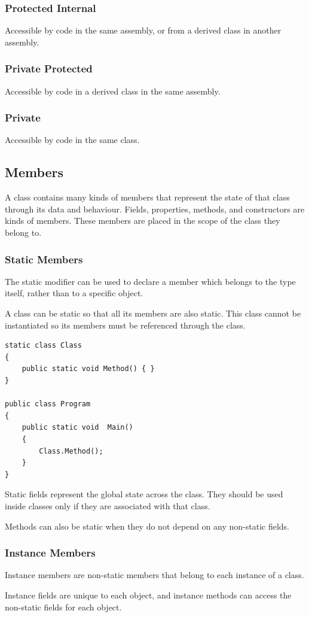 \documentclass{article}
\begin{document}
\subsubsection{Protected Internal}
Accessible by code in the same assembly, or from a derived class in another assembly.
\subsubsection{Private Protected}
Accessible by code in a derived class in the same assembly.
\subsubsection{Private}
Accessible by code in the same class.
\subsection{Members}
A class contains many kinds of members that represent the state of that class through its data and behaviour.
Fields, properties, methods, and constructors are kinds of members.
These members are placed in the scope of the class they belong to.
\subsubsection{Static Members}
The static modifier can be used to declare a member which belongs to the type itself, 
rather than to a specific object.

A class can be static so that all its members are also static. This class cannot be 
instantiated so its members must be referenced through the class.
\begin{lstlisting}
static class Class 
{
    public static void Method() { }
}

public class Program 
{
    public static void  Main() 
    {
        Class.Method();
    } 
}
\end{lstlisting}
Static fields represent the global state across the class. 
They should be used inside classes only if they are associated with that class.

Methods can also be static when they do not depend on any non-static fields.
\subsubsection{Instance Members}
Instance members are non-static members that belong to each instance of a class.

Instance fields are unique to each object, and instance methods can access the 
non-static fields for each object.
\end{document}
